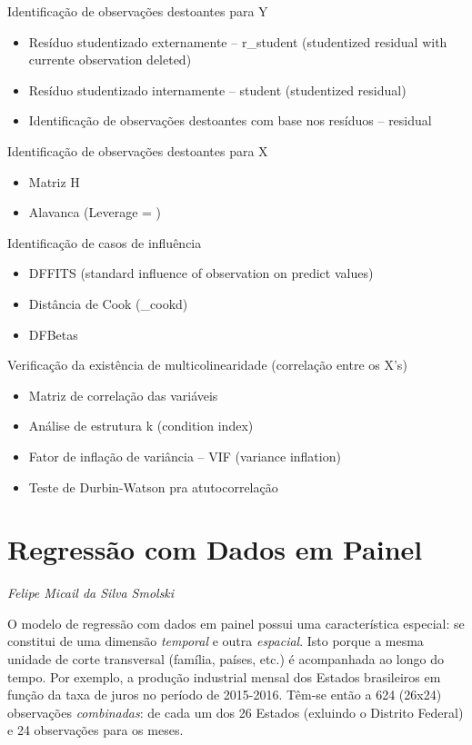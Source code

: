 \documentclass[12pt,brazil,oneside]{book}
\providecommand{\tightlist}{%
  \setlength{\itemsep}{0pt}\setlength{\parskip}{0pt}}
\begin{document}
Identificação de observações destoantes para Y

\begin{itemize}
\tightlist
\item
  Resíduo studentizado externamente -- r\_student (studentized residual with currente observation deleted)
\item
  Resíduo studentizado internamente -- student (studentized residual)
\item
  Identificação de observações destoantes com base nos resíduos -- residual
\end{itemize}

Identificação de observações destoantes para X

\begin{itemize}
\tightlist
\item
  Matriz H
\item
  Alavanca (Leverage = )
\end{itemize}

Identificação de casos de influência

\begin{itemize}
\tightlist
\item
  DFFITS (standard influence of observation on predict values)
\item
  Distância de Cook (\_cookd)
\item
  DFBetas
\end{itemize}

Verificação da existência de multicolinearidade (correlação entre os X's)

\begin{itemize}
\tightlist
\item
  Matriz de correlação das variáveis
\item
  Análise de estrutura k (condition index)
\item
  Fator de inflação de variância -- VIF (variance inflation)
\item
  Teste de Durbin-Watson pra atutocorrelação
\end{itemize}

\hypertarget{regressao-com-dados-em-painel}{%
\chapter{Regressão com Dados em Painel}\label{regressao-com-dados-em-painel}}

\emph{Felipe Micail da Silva Smolski}

O modelo de regressão com dados em painel possui uma característica especial: se constitui de uma dimensão \emph{temporal} e outra \emph{espacial}. Isto porque a mesma unidade de corte transversal (família, países, etc.) é acompanhada ao longo do tempo. Por exemplo, a produção industrial mensal dos Estados brasileiros em função da taxa de juros no período de 2015-2016. Têm-se então a 624 (26x24) observações \emph{combinadas}: de cada um dos 26 Estados (exluindo o Distrito Federal) e 24 observações para os meses.
\end{document}

